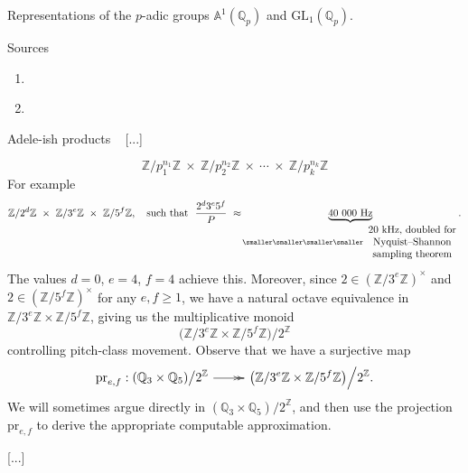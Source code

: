 \documentclass[letterpaper,11pt, reqno]{amsart}
\makeatletter
\newtheorem{monodromy theorem}{Monodromy Theorem}[subsection]
\newtheorem{wild conjecture}[theorem]{Wild Conjecture}
\newtheorem{research objectives}{Research objectives}[subsection]
\newtheorem{research question}[theorem]{Research questions}
\newtheorem{aside question}[theorem]{Aside question}
\newtheorem{audio example}[theorem]{\loudspeaker[3] Example}
\newtheorem{blank remark}[theorem]{}
\newtheorem{terminology and comment}[theorem]{Terminology and comment}
\newtheorem{purity hypothesis}[theorem]{Purity hypothesis}
\newtheorem{corollary of the purity hypothesis}[theorem]{Corollary of the purity hypothesis}
\newcommand{\QQ} {{\mathbb Q}}
\newcommand{\ZZ} {{\mathbb Z}}
\newcommand{\epi}{\!\xymatrix{{}\ar@{->>}[r]&{}}\!}
\numberwithin{equation}{theorem}
\makeatother
\begin{document}
\vskip 1cm

\begin{section}{Representations of the $p$-adic groups $\mathbb{A}^{\!1}(\mathbb{Q}_{p})$ and $\text{GL}_{1}(\mathbb{Q}_{p})$.}



\begin{subsection}{Sources}
	\begin{enumerate}[{\bf\ \ \ \ \ \ 1.}]
	\item
	\cite[Chp. XV\ \textemdash\ J. T. Tate's thesis, 1950]{CF}
	\item
	\cite[\S VII]{Lang}
	\end{enumerate}
\end{subsection}

\begin{subsection}{Adele-ish products}
\ 
{\color{red} [...]}

	$$
	\ZZ/p^{n_1}_{1}\ZZ
	\ \times\ 
	\ZZ/p^{n_2}_{2}\ZZ
	\ \times\ 
	\cdots
	\ \times\ 
	\ZZ/p^{n_{k}}_{k}\ZZ
	$$
For example
	$$
	\ZZ/2^{d}\ZZ
	\ \times\ 
	\ZZ/3^{e}\ZZ
	\ \times\ 
	\ZZ/5^{f}\ZZ,
	\ \ \ \text{such that}\ \ \frac{2^{d}3^{e}5^{f}}{P}
	\ \approx\!
	\underset{
	{\smaller\smaller\smaller\smaller
	\begin{array}{c}
	\text{20\ kHz, doubled for}
	\\
	\text{Nyquist–Shannon}
	\\
	\text{sampling theorem}
	\end{array}
	}\!\!
	}{\underbrace{40\ 000\ \text{Hz}}}.
	$$
The values $d=0$, $e=4$, $f=4$ achieve this. Moreover, since $2\in(\ZZ/3^{e}\ZZ)^{\times}$ and $2\in(\ZZ/5^{f}\ZZ)^{\times}$ for any $e,f\ge 1$, we have a natural octave equivalence in $\ZZ/3^e\ZZ\times\ZZ/5^f\ZZ$, giving us the multiplicative monoid
	$$
	\big(\ZZ/3^e\ZZ\times\ZZ/5^f\ZZ\big)\Big/2^{\ZZ}
	$$
controlling pitch-class movement. Observe that we have a surjective map
	$$
	\text{pr}_{e,f}:(\QQ_{3}\times\QQ_5)\big/2^{\ZZ}
	\epi
	\big(\ZZ/3^e\ZZ\times\ZZ/5^f\ZZ\big)\Big/2^{\ZZ}.
	$$
We will sometimes argue directly in $(\QQ_{3}\times\QQ_5)\big/2^{\ZZ}$, and then use the projection $\text{pr}_{e,f}$ to derive the appropriate computable approximation.

{\color{red} [...]}

\end{subsection}


\end{section}
\end{document}
